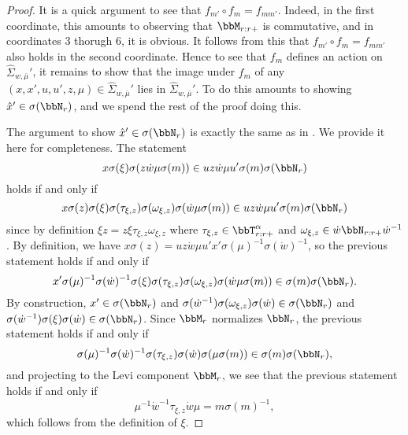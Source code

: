\begin{proof}
  It is a quick argument to see that $f_{m'} \circ f_{m} = f_{mm'}$. Indeed, in the first coordinate, this amounts to observing that $\bbM_{r:r+}$ is commutative, and in coordinates 3 thorugh 6, it is obvious. It follows from this that $f_{m'} \circ f_{m} = f_{mm'}$ also holds in the second coordinate. Hence to see that $f_m$ defines an action on $\widehat \Sigma_{w,\bar \mu}'$, it remains to show that the image under $f_m$ of any $(x,x',u,u',z,\mu) \in \widehat \Sigma_{w, \bar \mu}'$ lies in $\widehat \Sigma_{w, \bar \mu}'$. To do this amounts to showing $\hat x' \in \sigma(\bbN_r)$, and we spend the rest of the proof doing this.

  The argument to show $\hat x' \in \sigma(\bbN_r)$ is exactly the same as in \cite[p.\ 7]{Lus04}. We provide it here for completeness. The statement
  \begin{equation*}
    x \sigma(\xi) \sigma(z \dot w \mu \sigma(m)) \in u z \dot w \mu u' \sigma(m) \sigma(\bbN_r)
  \end{equation*}
  holds if and only if
  \begin{equation*}
    x \sigma(z) \sigma(\xi) \sigma(\tau_{\xi,z}) \sigma(\omega_{\xi,z}) \sigma(\dot w \mu \sigma(m)) \in u z \dot w \mu u' \sigma(m) \sigma(\bbN_r) 
  \end{equation*}
  since by definition $\xi z = z \xi \tau_{\xi, z} \omega_{\xi, z}$ where $\tau_{\xi, z} \in \bbT_{r:r+}^\alpha$ and $\omega_{\xi,z} \in \dot w \bbN_{r:r+} \dot w^{-1}$. By definition, we have $x\sigma(z) = u z \dot w \mu u' x' \sigma(\mu)^{-1} \sigma(\dot w)^{-1}$, so the previous statement holds if and only if
  \begin{equation*}
    x' \sigma(\mu)^{-1} \sigma(\dot w)^{-1} \sigma(\xi) \sigma(\tau_{\xi, z}) \sigma(\omega_{\xi,z}) \sigma(\dot w \mu \sigma(m)) \in \sigma(m) \sigma(\bbN_r).
  \end{equation*}
  By construction, $x' \in \sigma(\bbN_r)$ and $\sigma(\dot w^{-1}) \sigma(\omega_{\xi,z}) \sigma(\dot w) \in \sigma(\bbN_r)$ and $\sigma(\dot w^{-1}) \sigma(\xi) \sigma(\dot w) \in \sigma(\bbN_r)$. Since $\bbM_r$ normalizes $\bbN_r$, the previous statement holds if and only if
  \begin{equation*}
    \sigma(\mu)^{-1} \sigma(\dot w)^{-1} \sigma(\tau_{\xi,z}) \sigma(\dot w) \sigma(\mu \sigma(m)) \in \sigma(m) \sigma(\bbN_r),
  \end{equation*}
  and projecting to the Levi component $\bbM_r$, we see that the previous statement holds if and only if
  \begin{equation*}
    \mu^{-1} \dot w^{-1} \tau_{\xi,z} \dot w \mu = m \sigma(m)^{-1},
  \end{equation*}
  which follows from the definition of $\xi$.
\end{proof}


